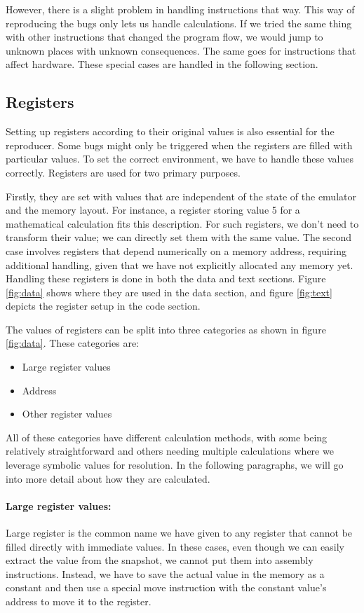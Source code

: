 However, there is a slight problem in handling instructions that way.
This way of reproducing the bugs only lets us handle calculations.
If we tried the same thing with other instructions that changed the program flow, we would jump to unknown places with unknown consequences.
The same goes for instructions that affect hardware.
These special cases are handled in the following section.

\subsection{Registers}
Setting up registers according to their original values is also essential for the reproducer.
Some bugs might only be triggered when the registers are filled with particular values.
To set the correct environment, we have to handle these values correctly.
Registers are used for two primary purposes.

Firstly, they are set with values that are independent of the state of the emulator and the memory layout.
For instance, a register storing value 5 for a mathematical calculation fits this description.
For such registers, we don't need to transform their value; we can directly set them with the same value.
The second case involves registers that depend numerically on a memory address, requiring additional handling, given that we have not explicitly allocated any memory yet.
Handling these registers is done in both the data and text sections.
Figure \ref{fig:data} shows where they are used in the data section, and figure \ref{fig:text} depicts the register setup in the code section.

The values of registers can be split into three categories as shown in figure \ref{fig:data}.
These categories are:
\begin{itemize}
    \item Large register values
    \item Address
    \item Other register values
\end{itemize}
All of these categories have different calculation methods, with some being relatively straightforward and others needing multiple calculations where we leverage symbolic values for resolution.
In the following paragraphs, we will go into more detail about how they are calculated.

\paragraph{Large register values:}
Large register is the common name we have given to any register that cannot be filled directly with immediate values.
In these cases, even though we can easily extract the value from the snapshot, we cannot put them into assembly instructions.
Instead, we have to save the actual value in the memory as a constant and then use a special move instruction with the constant value's address to move it to the register.

